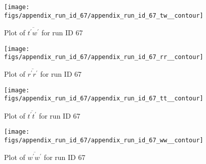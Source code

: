 \begin{figure}[H]
\centering
\texttt{[image: figs/appendix\_run\_id\_67/appendix\_run\_id\_67\_tw\_\_contour]}
\caption{Plot of $\overline{t^\prime w^\prime}$ for run ID 67}
\label{fig:appendix_run_id_67_tw__contour}
\end{figure}


\begin{figure}[H]
\centering
\texttt{[image: figs/appendix\_run\_id\_67/appendix\_run\_id\_67\_rr\_\_contour]}
\caption{Plot of $\overline{r^\prime r^\prime}$ for run ID 67}
\label{fig:appendix_run_id_67_rr__contour}
\end{figure}


\begin{figure}[H]
\centering
\texttt{[image: figs/appendix\_run\_id\_67/appendix\_run\_id\_67\_tt\_\_contour]}
\caption{Plot of $\overline{t^\prime t^\prime}$ for run ID 67}
\label{fig:appendix_run_id_67_tt__contour}
\end{figure}


\begin{figure}[H]
\centering
\texttt{[image: figs/appendix\_run\_id\_67/appendix\_run\_id\_67\_ww\_\_contour]}
\caption{Plot of $\overline{w^\prime w^\prime}$ for run ID 67}
\label{fig:appendix_run_id_67_ww__contour}
\end{figure}


